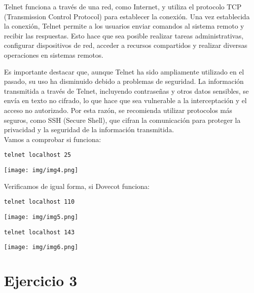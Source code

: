 \documentclass{article}
\begin{document}
Telnet funciona a través de una red, como Internet, y utiliza el protocolo TCP (Transmission Control Protocol) para establecer la conexión. Una vez establecida la conexión, Telnet permite a los usuarios enviar comandos al sistema remoto y recibir las respuestas. Esto hace que sea posible realizar tareas administrativas, configurar dispositivos de red, acceder a recursos compartidos y realizar diversas operaciones en sistemas remotos.

Es importante destacar que, aunque Telnet ha sido ampliamente utilizado en el pasado, su uso ha disminuido debido a problemas de seguridad. La información transmitida a través de Telnet, incluyendo contraseñas y otros datos sensibles, se envía en texto no cifrado, lo que hace que sea vulnerable a la interceptación y el acceso no autorizado. Por esta razón, se recomienda utilizar protocolos más seguros, como SSH (Secure Shell), que cifran la comunicación para proteger la privacidad y la seguridad de la información transmitida.
\\

Vamos a comprobar si funciona:

\lstset{language=Bash, breaklines=true, basicstyle=\footnotesize}
\begin{lstlisting}[frame=single]
telnet localhost 25
\end{lstlisting}

\begin{center}
\texttt{[image: img/img4.png]} 
\end{center}
 

Verificamos de igual forma, si Dovecot funciona:
\lstset{language=Bash, breaklines=true, basicstyle=\footnotesize}
\begin{lstlisting}[frame=single]
telnet localhost 110
\end{lstlisting}
\begin{center}
\texttt{[image: img/img5.png]} 
\end{center}
\lstset{language=Bash, breaklines=true, basicstyle=\footnotesize}
\begin{lstlisting}[frame=single]
telnet localhost 143
\end{lstlisting}
\begin{center}
\texttt{[image: img/img6.png]} 
\end{center}


\section{Ejercicio 3}
\end{document}

